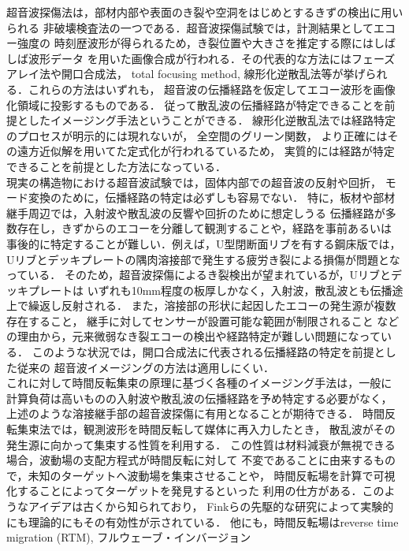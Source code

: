 超音波探傷法は，部材内部や表面のき裂や空洞をはじめとするきずの検出に用いられる
非破壊検査法の一つである．超音波探傷試験では，計測結果としてエコー強度の
時刻歴波形が得られるため，き裂位置や大きさを推定する際にはしばしば波形データ
を用いた画像合成が行われる．その代表的な方法にはフェーズアレイ法や開口合成法，
total focusing method, 線形化逆散乱法等が挙げられる．これらの方法はいずれも，
超音波の伝播経路を仮定してエコー波形を画像化領域に投影するものである．
従って散乱波の伝播経路が特定できることを前提としたイメージング手法ということができる．
線形化逆散乱法では経路特定のプロセスが明示的には現れないが， 全空間のグリーン関数，
より正確にはその遠方近似解を用いてた定式化が行われるているため，
実質的には経路が特定できることを前提とした方法になっている．
\\
\hspace{\parindent}
現実の構造物における超音波試験では，固体内部での超音波の反射や回折，
モード変換のために，伝播経路の特定は必ずしも容易でない．
特に，板材や部材継手周辺では，入射波や散乱波の反響や回折のために想定しうる
伝播経路が多数存在し，きずからのエコーを分離して観測することや，経路を事前あるいは
事後的に特定することが難しい．例えば，U型閉断面リブを有する鋼床版では，
Uリブとデッキプレートの隅肉溶接部で発生する疲労き裂による損傷が問題となっている．
そのため，超音波探傷によるき裂検出が望まれているが，Uリブとデッキプレートは
いずれも10mm程度の板厚しかなく，入射波，散乱波とも伝播途上で繰返し反射される．
また，溶接部の形状に起因したエコーの発生源が複数存在すること，
継手に対してセンサーが設置可能な範囲が制限されること
などの理由から，元来微弱なき裂エコーの検出や経路特定が難しい問題になっている．
このような状況では，開口合成法に代表される伝播経路の特定を前提とした従来の
超音波イメージングの方法は適用しにくい．
\\
\hspace{\parindent}
これに対して時間反転集束の原理に基づく各種のイメージング手法は，一般に
計算負荷は高いものの入射波や散乱波の伝播経路を予め特定する必要がなく，
上述のような溶接継手部の超音波探傷に有用となることが期待できる．
時間反転集束法では，観測波形を時間反転して媒体に再入力したとき，
散乱波がその発生源に向かって集束する性質を利用する．
この性質は材料減衰が無視できる場合，波動場の支配方程式が時間反転に対して
不変であることに由来するもので，未知のターゲットへ波動場を集束させることや，
時間反転場を計算で可視化することによってターゲットを発見するといった
利用の仕方がある．このようなアイデアは古くから知られており，
Finkらの先駆的な研究によって実験的にも理論的にもその有効性が示されている．
他にも，時間反転場はreverse time migration (RTM), フルウェーブ・インバージョン
